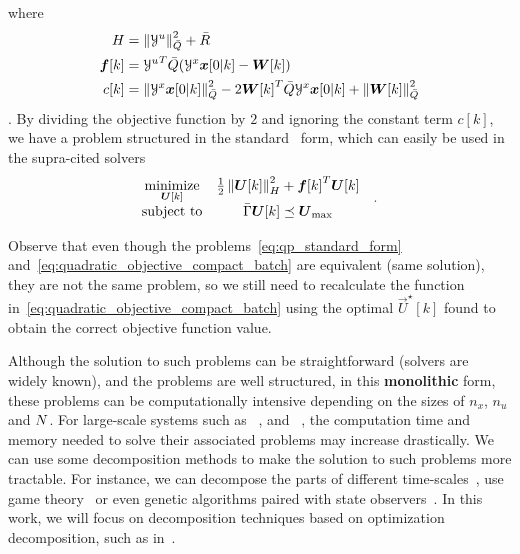 \documentclass[../main.tex]{subfiles}
\begin{document}
where
\begin{align}
  \label{eq:construction_H}
H&=\left\lVert\mathcal{Y}^{u}\right\rVert^{2}_{\bar{Q}}+\bar{R}\\
\boldsymbol{f}[k]&={\mathcal{Y}^{u}}^{T}\bar{Q}(\mathcal{Y}^{x}\boldsymbol{x}[0|k]-\boldsymbol{W}[k])\\
c[k]&=\left\lVert\mathcal{Y}^{x}\boldsymbol{x}[0|k]\right\rVert^{2}_{\bar{Q}}-2{\boldsymbol{W}[k]}^{T}\bar{Q}{\mathcal{Y}^{x}}\boldsymbol{x}[0|k]+\left\lVert\boldsymbol{W}[k]\right\rVert^{2}_{\bar{Q}}
\end{align}.
By dividing the objective function by $2$ and ignoring the constant term $c[k]$, we have a problem structured in the standard \qp\ form, which can easily be used in the supra-cited solvers
\begin{equation}
  \label{eq:qp_standard_form}
  \begin{aligned}
    \begin{matrix}
      \mathop{\textrm{minimize}}\limits_{\boldsymbol{U}[k]} &
      \frac{1}{2}\left\lVert\boldsymbol{U}[k]\right\rVert^{2}_{H} + {\boldsymbol{f}[k]}^{T}\boldsymbol{U}[k] &\\
      \mathrm{subject~ to} &
\bar{\Gamma}\boldsymbol{U}[k]\preceq {\boldsymbol{U}}_{\text{max}}
    \end{matrix}
  \end{aligned}.
\end{equation}

\begin{remark}\label{rem:equivalence_problems_not_same_objective}
  Observe that even though the problems~\eqref{eq:qp_standard_form} and~\eqref{eq:quadratic_objective_compact_batch} are equivalent (same solution), they are not the same problem, so we still need to recalculate the function in~\eqref{eq:quadratic_objective_compact_batch} using the optimal $\vec{U}^{\star}[k]$ found to obtain the correct objective function value.
\end{remark}

Although the solution to such problems can be straightforward (solvers are widely known), and the problems are well structured, in this \textbf{monolithic} form, these problems can be computationally intensive depending on the sizes of $n_{x}$, $n_{u}$ and $N$.
For large-scale systems such as \wdns~\cite{ZhangEtAl2021}, and \dhns~\cite{TaylorEtAl2021}, the computation time and memory needed to solve their associated problems may increase drastically.
We can use some decomposition methods to make the solution to such problems more tractable.
For instance, we can decompose the parts of different time-scales~\cite{ChenEtAl2011}, use game theory~\cite{MaestreEtAl2011} or even genetic algorithms paired with state observers~\cite{XieEtAl2016}.
In this work, we will focus on decomposition techniques based on optimization decomposition, such as in~\cite{GiselssonEtAl2013}.
\end{document}
